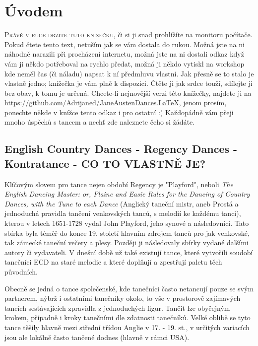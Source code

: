 \usepackage{hyperref}%
\chapter{Úvodem}

\lettrine{P}{rávě v ruce držíte tuto knížečku}, či si ji snad prohlížíte na monitoru počítače. Pokud čtete tento text, netuším jak se vám dostala do rukou. Možná jste na ni náhodně narazili při procházení internetu, možná jste na ni dostali odkaz když vám ji někdo potřeboval na rychlo předat, možná ji někdo vytiskl na workshop kde neměl čas (či náladu) napsat k ní předmluvu vlastní. Jak přesně se to stalo je vlastně jedno; knížečka je vám plně k dispozici. Čtěte ji jak srdce touží, sdílejte ji bez obav, k tomu je určená. Chcete-li nejnovější verzi této knížečky, najdete ji na \url{https://github.com/Adrijaned/JaneAustenDances.LaTeX}, jenom prosím, ponechte někde v knížce tento odkaz i pro ostatní :) Každopádně vám přeji mnoho úspěchů s tancem a nechť zde naleznete čeho si žádáte.

\section*{English Country Dances - Regency Dances - Kontratance - CO TO VLASTNĚ JE?}

Klíčovým slovem pro tance nejen období Regency je "Playford", neboli \textit{The English Dancing Master: or, Plaine and Easie Rules for the Dancing of Country Dances, with the Tune to each Dance} (Anglický taneční mistr, aneb Prostá a jednoduchá pravidla tančení venkovských tanců, s melodií ke každému tanci), kterou v letech 1651-1728 vydal John Playford, jeho synové a následovníci. Tato sbírka byla téměř do konce 19. století hlavním zdrojem tanců pro jak venkovské, tak zámecké taneční večery a plesy. Později ji následovaly sbírky vydané dalšími autory či vydavateli. V dnešní době už také existují tance, které vytvořili soudobí tanečníci ECD na staré melodie a které doplňují a  zpestřují paletu těch původních.

Obecně se jedná o tance společenské, kde tanečníci často netancují pouze se svým partnerem, nýbrž i ostatními tanečníky okolo, to vše v prostorově zajímavých tancích sestávajících zpravidla z jednoduchých figur. Tančit lze obyčejným krokem, případně i kroky tanečními dle zdatnosti tanečníků. Velké oblibě se tyto tance těšily hlavně mezi střední třídou Anglie v 17. - 19. st., v určitých variacích jsou ale lokálně často tančené dodnes (hlavně v rámci USA).

